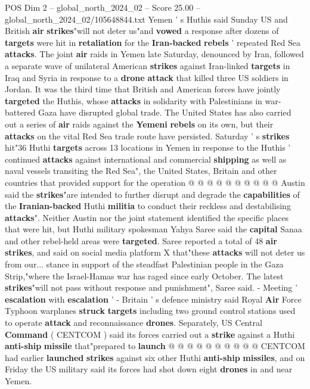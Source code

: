 \begin{textsample}{POS Dim 2 – global\_north\_2024\_02 – Score 25.00 – global\_north\_2024\_02/105648844.txt}  \label{ex:f2_pos_267}
Yemen ' s Huthis said Sunday US and British \textbf{air} \textbf{strikes}"will not deter us"and \textbf{vowed} a response after dozens of \textbf{targets} were hit in \textbf{retaliation} for the \textbf{Iran-backed} \textbf{rebels} ' repeated Red Sea \textbf{attacks}.
The joint \textbf{air} raids in Yemen late Saturday, denounced by Iran, followed a separate wave of unilateral American \textbf{strikes} against Iran-linked \textbf{targets} in Iraq and Syria in response to a \textbf{drone} \textbf{attack} that killed three US soldiers in Jordan.
It was the third time that British and American forces have jointly \textbf{targeted} the Huthis, whose \textbf{attacks} in solidarity with Palestinians in war-battered Gaza have disrupted global trade.
The United States has also carried out a series of \textbf{air} raids against the \textbf{Yemeni} \textbf{rebels} on its own, but their \textbf{attacks} on the vital Red Sea trade route have persisted.
Saturday ' s \textbf{strikes} hit"36 Huthi \textbf{targets} across 13 locations in Yemen in response to the Huthis ' continued \textbf{attacks} against international and commercial \textbf{shipping} as well as naval vessels transiting the Red Sea", the United States, Britain and other countries that provided support for the operation @ @ @ @ @ @ @ @ @ @ Austin said the \textbf{strikes}"are intended to further disrupt and degrade the \textbf{capabilities} of the \textbf{Iranian-backed} Huthi \textbf{militia} to conduct their reckless and destabilising \textbf{attacks}".
Neither Austin nor the joint statement identified the specific places that were hit, but Huthi military spokesman Yahya Saree said the \textbf{capital} Sanaa and other rebel-held areas were \textbf{targeted}.
Saree reported a total of 48 \textbf{air} \textbf{strikes}, and said on social media platform X that"these \textbf{attacks} will not deter us from our... stance in support of the steadfast Palestinian people in the Gaza Strip,"where the Israel-Hamas war has raged since early October.
The latest \textbf{strikes}"will not pass without response and punishment", Saree said. - Meeting ' \textbf{escalation} with \textbf{escalation} ' - Britain ' s defence ministry said Royal \textbf{Air} Force Typhoon warplanes \textbf{struck} \textbf{targets} including two ground control stations used to operate \textbf{attack} and reconnaissance \textbf{drones}.
Separately, US Central \textbf{Command} ( CENTCOM ) said its forces carried out a \textbf{strike} against a Huthi \textbf{anti-ship} \textbf{missile} that"prepared to \textbf{launch} @ @ @ @ @ @ @ @ @ @ CENTCOM had earlier \textbf{launched} \textbf{strikes} against six other Huthi \textbf{anti-ship} \textbf{missiles}, and on Friday the US military said its forces had shot down eight \textbf{drones} in and near Yemen.

\end{textsample}
